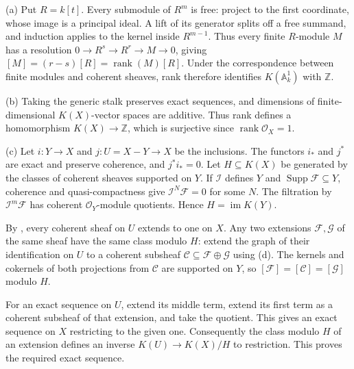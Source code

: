 (a) Put $R=k[t]$. Every submodule of $R^m$ is free: project to the first coordinate, whose image is a principal ideal. A lift of its generator splits off a free summand, and induction applies to the kernel inside $R^{m-1}$. Thus every finite $R$-module $M$ has a resolution $0\to R^s\to R^r\to M\to0$, giving $[M]=(r-s)[R]=\operatorname{rank}(M)[R]$. Under the correspondence between finite modules and coherent sheaves, rank therefore identifies $K(\mathbb A^1_k)$ with $\mathbb Z$.

(b) Taking the generic stalk preserves exact sequences, and dimensions of finite-dimensional $K(X)$-vector spaces are additive. Thus rank defines a homomorphism $K(X)\to\mathbb Z$, which is surjective since $\operatorname{rank}\mathcal O_X=1$.

(c) Let $i:Y\to X$ and $j:U=X-Y\to X$ be the inclusions. The functors $i_*$ and $j^*$ are exact and preserve coherence, and $j^*i_*=0$. Let $H\subseteq K(X)$ be generated by the classes of coherent sheaves supported on $Y$. If $\mathcal I$ defines $Y$ and $\operatorname{Supp}\mathcal F\subseteq Y$, coherence and quasi-compactness give $\mathcal I^N\mathcal F=0$ for some $N$. The filtration by $\mathcal I^m\mathcal F$ has coherent $\mathcal O_Y$-module quotients. Hence $H=\operatorname{im}K(Y)$.

By , every coherent sheaf on $U$ extends to one on $X$. Any two extensions $\mathcal F,\mathcal G$ of the same sheaf have the same class modulo $H$: extend the graph of their identification on $U$ to a coherent subsheaf $\mathcal C\subseteq\mathcal F\oplus\mathcal G$ using (d). The kernels and cokernels of both projections from $\mathcal C$ are supported on $Y$, so $[\mathcal F]=[\mathcal C]=[\mathcal G]$ modulo $H$.

For an exact sequence on $U$, extend its middle term, extend its first term as a coherent subsheaf of that extension, and take the quotient. This gives an exact sequence on $X$ restricting to the given one. Consequently the class modulo $H$ of an extension defines an inverse $K(U)\to K(X)/H$ to restriction. This proves the required exact sequence.
